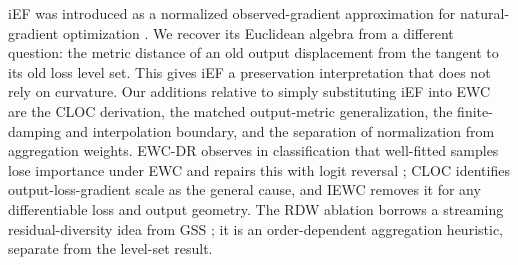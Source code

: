 iEF was introduced as a normalized observed-gradient approximation for natural-gradient optimization \citep{IEF}. We recover its Euclidean algebra from a different question: the metric distance of an old output displacement from the tangent to its old loss level set. This gives iEF a preservation interpretation that does not rely on curvature. Our additions relative to simply substituting iEF into EWC are the CLOC derivation, the matched output-metric generalization, the finite-damping and interpolation boundary, and the separation of normalization from aggregation weights. EWC-DR observes in classification that well-fitted samples lose importance under EWC and repairs this with logit reversal \citep{EWC-DR}; CLOC identifies output-loss-gradient scale as the general cause, and IEWC removes it for any differentiable loss and output geometry. The RDW ablation borrows a streaming residual-diversity idea from GSS \citep{GSS}; it is an order-dependent aggregation heuristic, separate from the level-set result.
